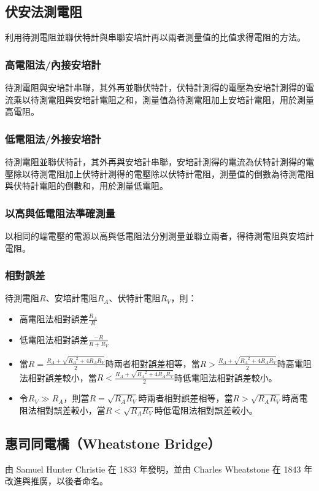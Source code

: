 \documentclass[a4paper,12pt]{report}
\begin{document}
\begin{itemize}
\subsection{伏安法測電阻}
利用待測電阻並聯伏特計與串聯安培計再以兩者測量值的比值求得電阻的方法。
\subsubsection{高電阻法/內接安培計}
待測電阻與安培計串聯，其外再並聯伏特計，伏特計測得的電壓為安培計測得的電流乘以待測電阻與安培計電阻之和，測量值為待測電阻加上安培計電阻，用於測量高電阻。
\subsubsection{低電阻法/外接安培計}
待測電阻並聯伏特計，其外再與安培計串聯，安培計測得的電流為伏特計測得的電壓除以待測電阻加上伏特計測得的電壓除以伏特計電阻，測量值的倒數為待測電阻與伏特計電阻的倒數和，用於測量低電阻。
\subsubsection{以高與低電阻法準確測量}
以相同的端電壓的電源以高與低電阻法分別測量並聯立兩者，得待測電阻與安培計電阻。
\subsubsection{相對誤差}
待測電阻$R$、安培計電阻$R_A$、伏特計電阻$R_V$，則：
\begin{itemize}
\item 高電阻法相對誤差$\frac{R_A}{R}$
\item 低電阻法相對誤差$\frac{-R}{R+R_V}$
\item 當$R=\frac{R_A+\sqrt{R_A^{\phantom{A}2}+4R_AR_V}}{2}$時兩者相對誤差相等，當$R>\frac{R_A+\sqrt{R_A^{\phantom{A}2}+4R_AR_V}}{2}$時高電阻法相對誤差較小，當$R<\frac{R_A+\sqrt{R_A^{\phantom{A}2}+4R_AR_V}}{2}$時低電阻法相對誤差較小。
\item 令$R_V\gg R_A$，則當$R=\sqrt{R_AR_V}$時兩者相對誤差相等，當$R>\sqrt{R_AR_V}$時高電阻法相對誤差較小，當$R<\sqrt{R_AR_V}$時低電阻法相對誤差較小。
\end{itemize}
\subsection{惠司同電橋（Wheatstone Bridge）}
由 Samuel Hunter Christie 在 1833 年發明，並由 Charles Wheatstone 在 1843 年改進與推廣，以後者命名。  


\end{itemize}
\end{document}
